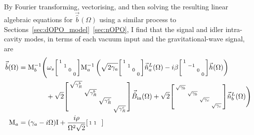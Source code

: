 By Fourier transforming, vectorising, and then solving the resulting linear algebraic equations for $\vec{\hat b}(\Omega)$ using a similar process to Sections~\ref{sec:dOPO_model}~\ref{sec:nOPO}, I find that the signal and idler intra-cavity modes, in terms of each vacuum input and the gravitational-wave signal, are 
\begin{align}
\vec{\hat{b}}(\Omega)&= \mathrm{M}_b^{-1}\Biggl(\omega_s\begin{bsmallmatrix}
1 &  &  &  \\
 & 1 &  &  \\
 &  & 0 &  \\
 &  &  & 0
\end{bsmallmatrix}\mathrm{M}_a^{-1}\left(\sqrt{2\gamma_a}\begin{bsmallmatrix}
1 &  &  &  \\
 & 1 &  &  \\
 &  & 0 &  \\
 &  &  & 0
\end{bsmallmatrix}\vec{\hat{n}}^L_a(\Omega)-i\beta\begin{bsmallmatrix}
1 &  &  &  \\
 & -1 &  &  \\
 &  & 0 &  \\
 &  &  & 0
\end{bsmallmatrix}\vec{h}(\Omega)\right)\\&\hspace{1.4cm}+ \sqrt{2}\begin{bsmallmatrix}
\sqrt{\gamma^b_R} &  &  &  \\
 & \sqrt{\gamma^b_R} &  &  \\
 &  & \sqrt{\gamma^c_R} &  \\
 &  &  & \sqrt{\gamma^c_R}
\end{bsmallmatrix}\vec{\hat B}_\mathrm{in}(\Omega) + \sqrt{2}\begin{bsmallmatrix}
\sqrt{\gamma_b} &  &  &  \\
 & \sqrt{\gamma_b} &  &  \\
 &  & \sqrt{\gamma_c} &  \\
 &  &  & \sqrt{\gamma_c}
\end{bsmallmatrix}\vec{\hat n}^L_b(\Omega)\Biggr)\nonumber\\
\mathrm{M}_a &= (\gamma_a-i\Omega)\mathrm{I}+\frac{i\rho}{\Omega^2 \sqrt{2}}\begin{bsmallmatrix}
1 & 1 &  &  \\

\end{bsmallmatrix}
\end{align}
